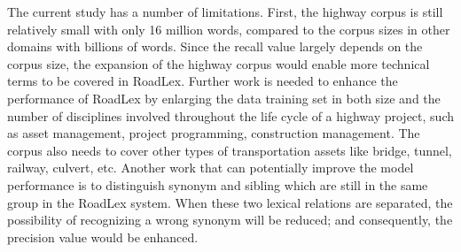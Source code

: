 \documentclass[Journal,InsideFigs, DoubleSpace]{ascelike} %
\begin{document}
\par
%
The current study has a number of limitations. First, the highway corpus is still relatively small with only 16 million words, compared to the corpus sizes in other domains with billions of words. Since the recall value largely depends on the corpus size, the expansion of the highway corpus would enable more technical terms to be covered in RoadLex. Further work is needed to enhance the performance of RoadLex by enlarging the data training set in both size and the number of disciplines involved throughout the life cycle of a highway project, such as asset management, project programming, construction management. The corpus also needs to cover other types of transportation assets like bridge, tunnel, railway, culvert, etc. Another work that can potentially improve the model performance is to distinguish synonym and sibling which are still in the same group in the RoadLex system. When these two lexical relations are separated, the possibility of recognizing a wrong synonym will be reduced; and consequently, the precision value would be enhanced.
%
\end{document}
